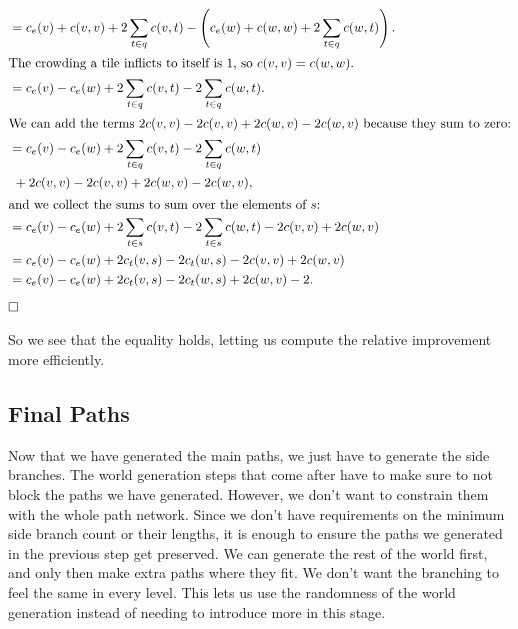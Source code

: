 \begin{align*}
     & = c_e(v) + c(v,v) + 2 \sum_{t \in q} c(v,t) - \left(c_e(w) + c(w,w) + 2 \sum_{t \in q} c(w,t) \right).                                                 \\
    \intertext{The crowding a tile inflicts to itself is 1, so $c(v,v) = c(w,w)$.}
     & = c_e(v) - c_e(w)  + 2 \sum_{t \in q} c(v,t) - 2 \sum_{t \in q} c(w,t) .                                                                               \\
    \intertext{We can add the terms $2c(v,v) - 2c(v,v) + 2c(w,v) - 2c(w,v)$ because they sum to zero:}
     & = c_e(v) - c_e(w)  + 2 \sum_{t \in q} c(v,t) - 2 \sum_{t \in q} c(w,t)                                                                                 \\
     & \ + 2c(v,v) - 2c(v,v) + 2c(w,v) - 2c(w,v),                                                                                                             \\
    \intertext{and we collect the sums to sum over the elements of $s$:}
     & = c_e(v) - c_e(w)  + 2 \sum_{t \in s} c(v,t) - 2 \sum_{t \in s} c(w,t) - 2c(v,v) + 2c(w,v)                                                             \\
     & = c_e(v) - c_e(w)  + 2 c_t(v,s) - 2 c_t(w,s) - 2c(v,v) + 2c(w,v)                                                                                       \\
     & = c_e(v) - c_e(w)  + 2 c_t(v,s) - 2 c_t(w,s) + 2c(w,v) - 2 .                                                                                           \\
\end{align*}
$\hfill\square$

So we see that the equality holds, letting us compute the relative improvement more efficiently.

\subsection{Final Paths}

Now that we have generated the main paths, we just have to generate the side branches.
The world generation steps that come after have to make sure to not block the paths we have generated.
However, we don't want to constrain them with the whole path network.
Since we don't have requirements on the minimum side branch count or their lengths, it is enough to ensure the paths we generated in the previous step get preserved.
We can generate the rest of the world first, and only then make extra paths where they fit.
We don't want the branching to feel the same in every level.
This lets us use the randomness of the world generation instead of needing to introduce more in this stage.

